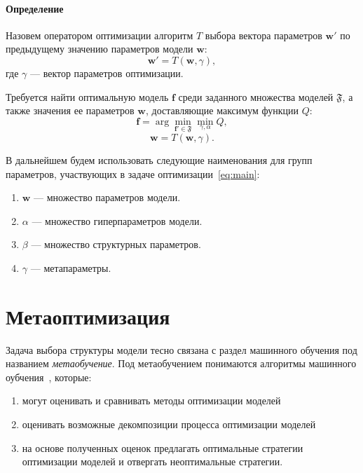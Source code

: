 \documentclass{article}
\begin{document}
\paragraph{Определение } Назовем оператором оптимизации алгоритм $T$ выбора вектора параметров $\mathbf{w}'$ по предыдущему значению параметров модели $\mathbf{w}$:
    $$
        \mathbf{w}' = T(\mathbf{w}, \gamma),
    $$
где $\gamma$ --- вектор параметров оптимизации.
 

Требуется найти оптимальную модель $\mathbf{f}$ среди заданного множества моделей $\mathfrak{F}$, а также значения ее параметров $\mathbf{w}$, доставляющие максимум функции $Q$:
\begin{equation}
\label{eq:main}
\mathbf{f} = \arg \min_{\mathbf{f}' \in \mathfrak{F}} \min_{\gamma, \alpha} Q,
\end{equation}
\[
\mathbf{w} = T(\mathbf{w}, \gamma).
\]

В дальнейшем будем использовать следующие наименования для групп параметров, участвующих в задаче оптимизации~\eqref{eq:main}:
\begin{enumerate}
\item $\mathbf{w}$ --- множество параметров модели.
\item $\alpha$ --- множество гиперпараметров модели.
\item $\beta$ --- множество структурных параметров.
\item $\gamma$ --- метапараметры.
\end{enumerate}


\section{Метаоптимизация}
Задача выбора структуры модели тесно связана с раздел машинного обучения под названием \textit{метаобучение}. Под метаобучением понимаются алгоритмы машинного оубчения~\cite{metalearn}, которые:
\begin{enumerate}
\item могут оценивать и сравнивать методы оптимизации моделей
\item оценивать возможные декомпозиции процесса оптимизации моделей
\item на основе полученных оценок предлагать оптимальные стратегии оптимизации моделей и отвергать неоптимальные стратегии. 
\end{enumerate}
\end{document}
